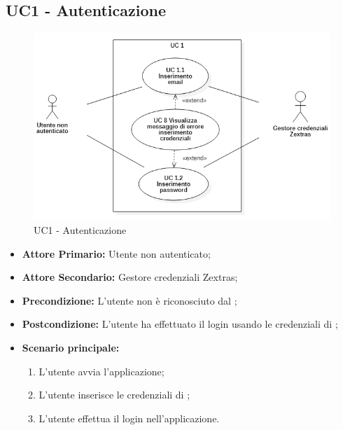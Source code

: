 \subsection{UC1 - Autenticazione}
\label{UC1}
\begin{figure}[H]
    \centering
    \includegraphics[scale = 0.7]{components/img/UC1.png}
    \caption{UC1 - Autenticazione}
\end{figure}
\begin{itemize}
\item \textbf{Attore Primario:} Utente non autenticato;
\item \textbf{Attore Secondario:} Gestore credenziali Zextras;
\item \textbf{Precondizione:} L'utente non è riconosciuto dal ;
\item \textbf{Postcondizione:} L'utente ha effettuato il login usando le credenziali di ;
\item \textbf{Scenario principale:}
    \begin{enumerate}
    \item L'utente avvia l'applicazione;
    \item L'utente inserisce le credenziali di ;
    \item L'utente effettua il login nell'applicazione.
    \end{enumerate}
\end{itemize}
